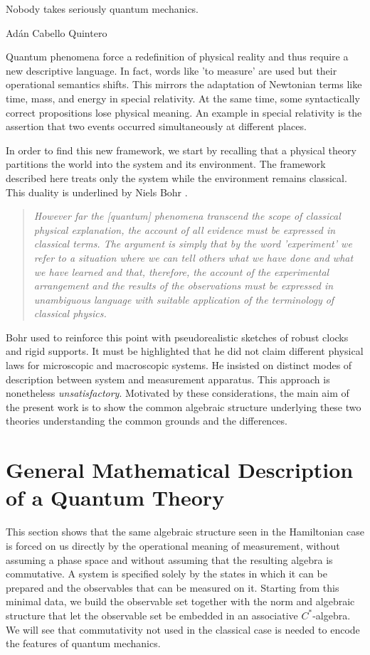 
\setlength{\headwidth}{\textwidth}

\setcounter{chapter}{2}
\epigraph{Nobody takes seriously quantum mechanics.}{Adán Cabello Quintero}

Quantum phenomena force a redefinition of physical reality and thus require a new descriptive language. In fact, words like 'to measure' are used but their operational semantics shifts. This mirrors the adaptation of Newtonian terms like time, mass, and energy in special relativity. At the same time, some syntactically correct propositions lose physical meaning. An example in special relativity is the assertion that two events occurred simultaneously at different places.

In order to find this new framework, we start by recalling that a physical theory partitions the world into the system and its environment. The framework described here treats only the system while the environment remains classical. This duality is underlined by Niels Bohr \cite{schilppAlbertEinsteinPhilosopherscientist1991}.
\begin{quote}
	\textit{However far the [quantum] phenomena transcend the scope of classical physical explanation, the account of all evidence must be expressed in classical terms. The argument is simply that by the word 'experiment' we refer to a situation where we can tell others what we have done and what we have learned and that, therefore, the account of the experimental arrangement and the results of the observations must be expressed in unambiguous language with suitable application of the terminology of classical physics.}
\end{quote}
Bohr used to reinforce this point with pseudorealistic sketches of robust clocks and rigid supports. It must be highlighted that he did not claim different physical laws for microscopic and macroscopic systems. He insisted on distinct modes of description between system and measurement apparatus. This approach is nonetheless \emph{unsatisfactory}. Motivated by these considerations, the main aim of the present work is to show the common algebraic structure underlying these two theories understanding the common grounds and the differences.

\section{General Mathematical Description of a Quantum Theory}\label{sec:intro-alg-quant}
This section shows that the same algebraic structure seen in the Hamiltonian case is forced on us directly by the operational meaning of measurement, without assuming a phase space
and without assuming that the resulting algebra is commutative. A system is specified solely by the states in which it can be prepared and the observables that can be measured on it. Starting from this minimal data, we build the observable set together with the norm and algebraic structure that let the observable set be embedded in an associative $C^*$-algebra. We will see that commutativity not used in the classical case is needed to encode the features of quantum mechanics.

